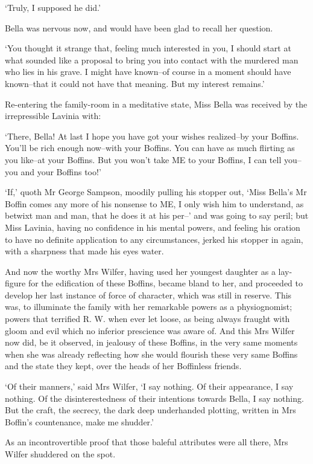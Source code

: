 ‘Truly, I supposed he did.’

Bella was nervous now, and would have been glad to recall her question.

‘You thought it strange that, feeling much interested in you, I should
start at what sounded like a proposal to bring you into contact with the
murdered man who lies in his grave. I might have known--of course in a
moment should have known--that it could not have that meaning. But my
interest remains.’

Re-entering the family-room in a meditative state, Miss Bella was
received by the irrepressible Lavinia with:

‘There, Bella! At last I hope you have got your wishes realized--by your
Boffins. You’ll be rich enough now--with your Boffins. You can have as
much flirting as you like--at your Boffins. But you won’t take ME to
your Boffins, I can tell you--you and your Boffins too!’

‘If,’ quoth Mr George Sampson, moodily pulling his stopper out, ‘Miss
Bella’s Mr Boffin comes any more of his nonsense to ME, I only wish him
to understand, as betwixt man and man, that he does it at his per--’ and
was going to say peril; but Miss Lavinia, having no confidence in his
mental powers, and feeling his oration to have no definite application
to any circumstances, jerked his stopper in again, with a sharpness that
made his eyes water.

And now the worthy Mrs Wilfer, having used her youngest daughter as a
lay-figure for the edification of these Boffins, became bland to her,
and proceeded to develop her last instance of force of character,
which was still in reserve. This was, to illuminate the family with her
remarkable powers as a physiognomist; powers that terrified R. W. when
ever let loose, as being always fraught with gloom and evil which no
inferior prescience was aware of. And this Mrs Wilfer now did, be it
observed, in jealousy of these Boffins, in the very same moments when
she was already reflecting how she would flourish these very same
Boffins and the state they kept, over the heads of her Boffinless
friends.

‘Of their manners,’ said Mrs Wilfer, ‘I say nothing. Of their
appearance, I say nothing. Of the disinterestedness of their intentions
towards Bella, I say nothing. But the craft, the secrecy, the dark
deep underhanded plotting, written in Mrs Boffin’s countenance, make me
shudder.’

As an incontrovertible proof that those baleful attributes were all
there, Mrs Wilfer shuddered on the spot.


